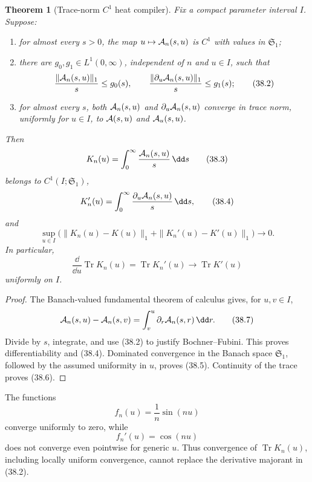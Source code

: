\documentclass[11pt]{article}
\newtheorem{theorem}{Theorem}[section]
\theoremstyle{remark}
\begin{document}
\begin{theorem}[Trace-norm \(C^1\) heat compiler]
\label{thm:v15v38-c1-heat}
Fix a compact parameter interval \(I\).  Suppose:
\begin{enumerate}
\item for almost every \(s>0\), the map
      \(u\mapsto{\cal A}_n(s,u)\) is \(C^1\) with values in
      \({\mathfrak S}_1\);
\item there are \(g_0,g_1\in L^1(0,\infty)\), independent of
      \(n\) and \(u\in I\), such that
      \[
       \frac{\|{\cal A}_n(s,u)\|_1}{s}\leq g_0(s),
       \qquad
       \frac{\|\partial_u{\cal A}_n(s,u)\|_1}{s}
       \leq g_1(s);                                     \tag{38.2}
      \]
\item for almost every \(s\), both
      \({\cal A}_n(s,u)\) and
      \(\partial_u{\cal A}_n(s,u)\) converge in trace norm,
      uniformly for \(u\in I\), to
      \({\cal A}(s,u)\) and \({\cal A}_u(s,u)\).
\end{enumerate}
Then
\[
 K_n(u)=\int_0^\infty\frac{{\cal A}_n(s,u)}s\,\dd s      \tag{38.3}
\]
belongs to \(C^1(I;{\mathfrak S}_1)\),
\[
 K_n'(u)=
 \int_0^\infty\frac{\partial_u{\cal A}_n(s,u)}s\,\dd s, \tag{38.4}
\]
and
\[
 \sup_{u\in I}\bigl(
 \|K_n(u)-K(u)\|_1+
 \|K_n'(u)-K'(u)\|_1\bigr)\longrightarrow0.             \tag{38.5}
\]
In particular,
\[
 \frac{\dd}{\dd u}\operatorname{Tr}K_n(u)
 =\operatorname{Tr}K_n'(u)
 \longrightarrow\operatorname{Tr}K'(u)                 \tag{38.6}
\]
uniformly on \(I\).
\end{theorem}

\begin{proof}
The Banach-valued fundamental theorem of calculus gives, for
\(u,v\in I\),
\[
 {\cal A}_n(s,u)-{\cal A}_n(s,v)
 =\int_v^u\partial_r{\cal A}_n(s,r)\,\dd r.              \tag{38.7}
\]
Divide by \(s\), integrate, and use (38.2) to justify
Bochner--Fubini.  This proves differentiability and (38.4).
Dominated convergence in the Banach space
\({\mathfrak S}_1\), followed by the assumed uniformity in \(u\),
proves (38.5).  Continuity of the trace proves (38.6).
\end{proof}

\begin{countertheorem}
\label{cth:v15v38-values-not-derivatives}
The functions
\[
 f_n(u)=\frac1n\sin(nu)                                  \tag{38.8}
\]
converge uniformly to zero, while
\[
 f_n'(u)=\cos(nu)                                        \tag{38.9}
\]
does not converge even pointwise for generic \(u\).  Thus convergence
of \(\operatorname{Tr}K_n(u)\), including locally uniform
convergence, cannot replace the derivative majorant in (38.2).
\end{countertheorem}
\end{document}
